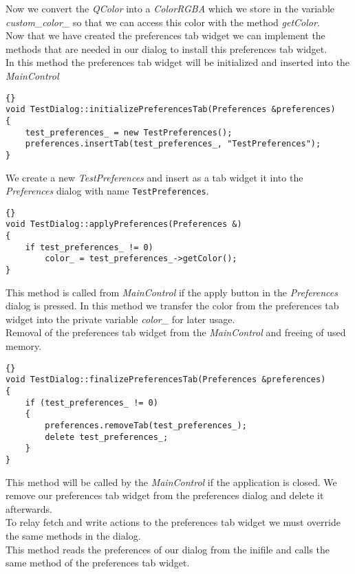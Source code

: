 Now we convert the {\em QColor} into a {\em ColorRGBA} which we store in the
variable {\em custom\_color\_} so that we can access this color with the method
{\em getColor}.\\

Now that we have created the preferences tab widget we can implement the methods that 
are needed in our dialog to install this preferences tab widget.\\ 

In this method the preferences tab widget will be initialized and inserted into the
{\em MainControl}

\begin{lstlisting}{}
void TestDialog::initializePreferencesTab(Preferences &preferences)
{
	test_preferences_ = new TestPreferences();
	preferences.insertTab(test_preferences_, "TestPreferences");
}
\end{lstlisting}

We create a new {\em TestPreferences} and insert as a tab widget it into the 
{\em Preferences} dialog with name {\tt TestPreferences}.

\begin{lstlisting}{}
void TestDialog::applyPreferences(Preferences &)
{
	if test_preferences_ != 0)
		color_ = test_preferences_->getColor();
}
\end{lstlisting}

This method is called from {\em MainControl} if the apply button in the {\em Preferences} dialog
is pressed.
In this method we transfer the color from the preferences tab widget into the private
variable {\em color\_} for later usage.\\

Removal of the preferences tab widget from the {\em MainControl} and freeing of used
memory.

\begin{lstlisting}{}
void TestDialog::finalizePreferencesTab(Preferences &preferences)
{
	if (test_preferences_ != 0)
	{
		preferences.removeTab(test_preferences_);
		delete test_preferences_;
	}
}
\end{lstlisting}

This method will be called by the {\em MainControl} if the application is closed. We
remove our preferences tab widget from the preferences dialog and delete it afterwards.\\

To relay fetch and write actions to the preferences tab widget we must override
the same methods in the dialog.\\
This method reads the preferences of our dialog from the inifile and calls
the same method of the preferences tab widget.

